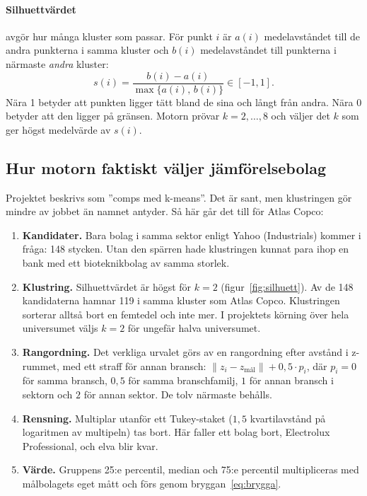\paragraph{Silhuettvärdet} avgör hur många kluster som passar. För punkt $i$ är $a(i)$
medelavståndet till de andra punkterna i samma kluster och $b(i)$ medelavståndet till punkterna
i närmaste \emph{andra} kluster:
\begin{equation}
  s(i) = \frac{b(i) - a(i)}{\max\{a(i),\, b(i)\}} \in [-1, 1] .
  \label{eq:silhuett}
\end{equation}
Nära 1 betyder att punkten ligger tätt bland de sina och långt från andra. Nära 0 betyder att
den ligger på gränsen. Motorn prövar $k = 2, \dots, 8$ och väljer det $k$ som ger högst
medelvärde av $s(i)$.

\subsection{Hur motorn faktiskt väljer jämförelsebolag}
\label{sec:peers-arligt}

Projektet beskrivs som ”comps med k-means”. Det är sant, men klustringen gör mindre av jobbet
än namnet antyder. Så här går det till för Atlas Copco:

\begin{enumerate}
  \item \textbf{Kandidater.} Bara bolag i samma sektor enligt Yahoo (Industrials) kommer i
    fråga: 148 stycken. Utan den spärren hade klustringen kunnat para ihop en bank med ett
    bioteknikbolag av samma storlek.
  \item \textbf{Klustring.} Silhuettvärdet är högst för $k = 2$ (figur~\ref{fig:silhuett}).
    Av de 148 kandidaterna hamnar 119 i samma kluster som Atlas Copco. Klustringen sorterar
    alltså bort en femtedel och inte mer. I projektets körning över hela universumet väljs $k = 2$ för ungefär
    halva universumet.
  \item \textbf{Rangordning.} Det verkliga urvalet görs av en rangordning efter avstånd i
    z-rummet, med ett straff för annan bransch:
    $\lVert z_i - z_{\text{mål}} \rVert + 0,5 \cdot p_i$, där $p_i = 0$ för samma bransch,
    $0,5$ för samma branschfamilj, $1$ för annan bransch i sektorn och $2$ för annan sektor.
    De tolv närmaste behålls.
  \item \textbf{Rensning.} Multiplar utanför ett Tukey-staket ($1,5$ kvartilavstånd på
    logaritmen av multipeln) tas bort. Här faller ett bolag bort, Electrolux Professional, och
    elva blir kvar.
  \item \textbf{Värde.} Gruppens 25:e percentil, median och 75:e percentil multipliceras med
    målbolagets eget mått och förs genom bryggan~\eqref{eq:brygga}.
\end{enumerate}

